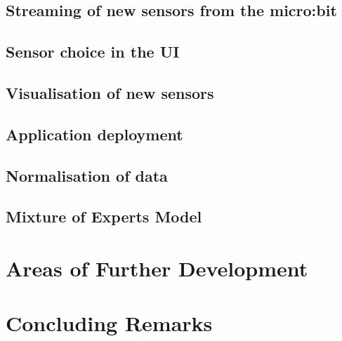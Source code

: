 \documentclass{article}
\begin{document}
\subsection{Streaming of new sensors from the micro:bit}%
\label{subsec:label}

\subsection{Sensor choice in the UI}%
\label{subsec:label}


\subsection{Visualisation of new sensors}%
\label{subsec:sensorvis}

\subsection{Application deployment}%
\label{subsec:deployment}

\subsection{Normalisation of data}%
\label{subsec:datanorm}

\subsection{Mixture of Experts Model}%
\label{subsec:moe}

\section{Areas of Further Development}%
\label{sec:development}

\section{Concluding Remarks}%
\label{sec:conclusion}
\end{document}
